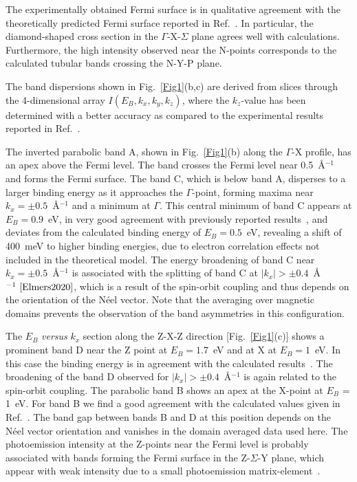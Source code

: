 \documentclass[aps,prb,twocolumn,superscriptaddress,10pt]{revtex4-1}
\begin{document}
The experimentally obtained Fermi surface is in qualitative agreement with the theoretically predicted Fermi surface reported in Ref.~. 
In particular, the diamond-shaped cross section in 
the $\Gamma$-X-$\Sigma$ plane
agrees well with calculations. 
Furthermore, the high intensity observed near the N-points corresponds
to the calculated tubular bands crossing the N-Y-P plane.

The band dispersions shown in Fig.~\ref{Fig1}(b,c) 
are derived from slices through the 4-dimensional array 
$I(E_B,k_x,k_y,k_z)$, where the $k_z$-value has been determined with a better accuracy as compared to the experimental results reported in Ref.~.

The inverted parabolic band A, shown in 
Fig.~\ref{Fig1}(b) along the $\Gamma$-X profile,
has an apex above the Fermi level. 
The band crosses the Fermi level
near 0.5~\AA$^{-1}$ and forms the Fermi surface.
The band C, which is below band A, disperses to a larger binding energy as it approaches the $\Gamma$-point, forming maxima near $k_x = \pm 0.5$~\AA$^{-1}$ and a minimum at $\Gamma$. 
This central minimum of band C appears at
$E_B = 0.9$~eV, in very good agreement with previously reported results~\cite{Elmers2020}, 
and deviates from the calculated
binding energy of $E_B = 0.5$~eV, revealing a shift of 400~meV to higher binding energies, 
due to electron correlation effects not included in the theoretical model. 
The energy broadening of band C near $k_x = \pm 0.5$~\AA$^{-1}$
is associated with the splitting of band C at $|k_x| > \pm 0.4$~\AA$^{-1}~\cite{Elmers2020}$, 
which is a result of the
spin-orbit coupling and thus depends on the orientation of the N{\'e}el vector.
Note that the averaging over magnetic domains prevents the observation
of the band  asymmetries in this configuration.

The $E_B$ {\it versus} $k_{x}$ section along the Z-X-Z direction
[Fig.~\ref{Fig1}(c)] shows a prominent band D near the Z point at $E_B = 1.7$~eV and at X at  $E_B = 1$~eV. 
In this case the binding energy is in agreement
with the calculated results~\cite{Elmers2020}. 
The broadening of the band D observed for $|k_x| > \pm 0.4$~\AA$^{-1}$ 
is again related to the spin-orbit coupling. 
The parabolic band B shows an apex at the X-point at $E_B$ = 1~eV. 
For band B we find a good agreement with the calculated values 
given in Ref.~.
The  band gap between bands B and D at this position
depends on the N{\'e}el vector orientation and vanishes in the 
domain averaged data used here. 
The photoemission intensity at the Z-points near the Fermi level 
is probably associated with bands forming the Fermi surface in the Z-$\Sigma$-Y plane,
which appear with weak intensity due to a small photoemission matrix-element~\cite{Fedchenko2022}.
\end{document}
